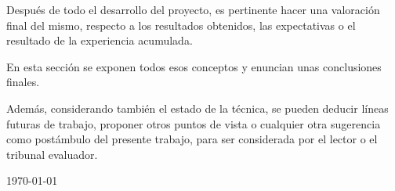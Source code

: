 
	Después de todo el desarrollo del proyecto, es pertinente hacer una valoración final del mismo, respecto a los resultados obtenidos, las expectativas o el resultado de la experiencia acumulada.

	En esta sección se exponen todos esos conceptos y enuncian unas conclusiones finales.
	
	Además, considerando también el estado de la técnica, se pueden deducir líneas futuras de trabajo, proponer otros puntos de vista o cualquier otra sugerencia como postámbulo del presente trabajo, para ser considerada por el lector o el tribunal evaluador.

\begin{flushright}
{\large \pfcauthorname}\nli
\today
\end{flushright}
	
\chapterend